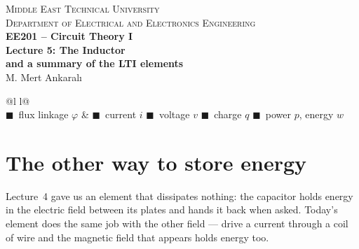 \documentclass[11pt,a4paper]{article}
\newcommand{\Icol}[1]{\textcolor{ccur}{#1}}
\newcommand{\Vcol}[1]{\textcolor{cvolt}{#1}}
\newcommand{\Pcol}[1]{\textcolor{cpow}{#1}}
\newcommand{\Qcol}[1]{\textcolor{ccharge}{#1}}
\newcommand{\Fcol}[1]{\textcolor{cflux}{#1}}
\begin{document}
\begin{center}
\begin{tcolorbox}[enhanced, colback=metured!5, colframe=metured, boxrule=1pt,
                  arc=3pt, left=10pt,right=10pt,top=7pt,bottom=7pt, width=\textwidth]
\begin{center}
  {\small\scshape Middle East Technical University}\\[2pt]
  {\small\scshape Department of Electrical and Electronics Engineering}\\[7pt]
  {\Large\bfseries\color{metured} EE201 -- Circuit Theory I}\\[4pt]
  {\large\bfseries Lecture 5: The Inductor\\ and a summary of the LTI elements}\\[6pt]
  {\small M. Mert Ankaralı}
\end{center}
\end{tcolorbox}
\end{center}
\vspace{-0.5em}

\begin{center}
\small
\begin{tabular}{@{}l l@{}}
\toprule
{}\\
\midrule
\Fcol{$\blacksquare$}~flux linkage $\varphi$ & \Icol{$\blacksquare$}~current $i$ \quad
\Vcol{$\blacksquare$}~voltage $v$ \quad \Qcol{$\blacksquare$}~charge $q$ \quad
\Pcol{$\blacksquare$}~power $p$, energy $w$\\
\bottomrule
\end{tabular}
\end{center}

\section{The other way to store energy}

Lecture~4 gave us an element that dissipates nothing: the capacitor holds energy in the
electric field between its plates and hands it back when asked. Today's element does the
same job with the other field --- drive a current through a coil of wire and the magnetic
field that appears holds energy too.
\end{document}
